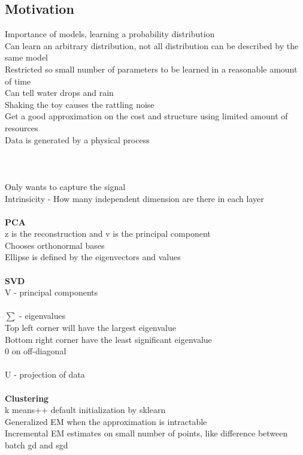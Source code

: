 \documentclass[11pt]{article}
\begin{document}
\subsection*{Motivation}
Importance of models, learning a probability distribution\\
Can learn an arbitrary distribution, not all distribution can be described by the same model\\
Restricted so small number of parameters to be learned in a reasonable amount of time
\\
Can tell water drops and rain\\
Shaking the toy causes the rattling noise\\
Get a good approximation on the cost and structure using limited amount of resources
\\
Data is generated by a physical process\\
\\\\\\
Only wants to capture the signal
\\
Intrinsicity - How many independent dimension are there in each layer\\
\\
\textbf{PCA}\\
z is the reconstruction and v is the principal component\\
Chooses orthonormal bases\\
Ellipse is defined by the eigenvectors and values
\\\\
\textbf{SVD}\\
V - principal components\\\\
$\sum$ - eigenvalues\\
Top left corner will have the largest eigenvalue\\
Bottom right corner have the least significant eigenvalue\\
0 on off-diagonal \\
\\
U - projection of data\\
\\
\textbf{Clustering}\\
k means++ default initialization by sklearn\\
Generalized EM when the approximation is intractable\\
Incremental EM estimates on small number of points, like difference between batch gd and sgd
\\
\end{document}
